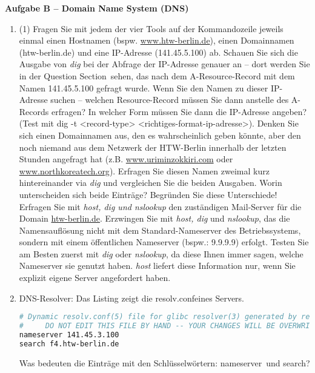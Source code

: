 \documentclass[paper=a4,fontsize=11pt]{scrartcl}%
\numberwithin{equation}{section}
\begin{document}
\begin{center}\Large{\textbf{Aufgabe B -- Domain Name System (DNS)}}\end{center}\vskip0.25in
\begin{enumerate}
	\item
\begin{tasks}(1)
		\task Fragen Sie mit jedem der vier Tools auf der Kommandozeile jeweils einmal einen Hostnamen (bspw. \url{www.htw-berlin.de}), einen Domainnamen (htw-berlin.de) und eine IP-Adresse (141.45.5.100) ab.
		\task Schauen Sie sich die Ausgabe von \emph{dig} bei der Abfrage der IP-Adresse genauer an -- dort werden Sie in der \glqq Question Section\grqq\ sehen, das nach dem A-Resource-Record mit dem Namen 141.45.5.100 gefragt wurde. Wenn Sie den Namen zu dieser IP-Adresse suchen -- welchen Resource-Record müssen Sie dann anstelle des A-Records erfragen? 
		\task In welcher Form müssen Sie dann die IP-Adresse angeben?\\
		(Test mit dig -t <record-type> <richtiges-format-ip-adresse>).
		\task Denken Sie sich einen Domainnamen aus, den es wahrscheinlich geben könnte, aber den noch niemand aus dem Netzwerk der HTW-Berlin innerhalb der letzten Stunden angefragt hat (z.B. \url{www.uriminzokkiri.com} oder \url{www.northkoreatech.org}).
		\task Erfragen Sie diesen Namen zweimal kurz hintereinander via \emph{dig} und vergleichen Sie die beiden Ausgaben. Worin unterscheiden sich beide Einträge? Begründen Sie diese Unterschiede!
		\task Erfragen Sie mit \emph{host, dig und nslookup} den zuständigen Mail-Server für die Domain \url{htw-berlin.de}.
		\task Erzwingen Sie mit \emph{host, dig} und \emph{nslookup}, das die Namensauflösung nicht mit dem Standard-Nameserver des Betriebssystems, sondern mit einem öffentlichen Nameserver (bspw.: 9.9.9.9) erfolgt. Testen Sie am Besten zuerst mit \emph{dig} oder \emph{nslookup}, da diese Ihnen immer sagen, welche Nameserver sie genutzt haben. \emph{host} liefert diese Information nur, wenn Sie explizit eigene Server angefordert haben.
	\end{tasks}
	\item DNS-Resolver: Das Listing zeigt die \glqq resolv.conf\grqq eines Servers. 
	\begin{lstlisting}[style=Bash, language=Bash]
# Dynamic resolv.conf(5) file for glibc resolver(3) generated by resolvconf(8)
#     DO NOT EDIT THIS FILE BY HAND -- YOUR CHANGES WILL BE OVERWRITTEN
nameserver 141.45.3.100
search f4.htw-berlin.de
\end{lstlisting} \label{dns}
Was bedeuten die Einträge mit den Schlüsselwörtern: \glqq nameserver\grqq\ und \glqq search\grqq ?
\end{enumerate}
\end{document}
